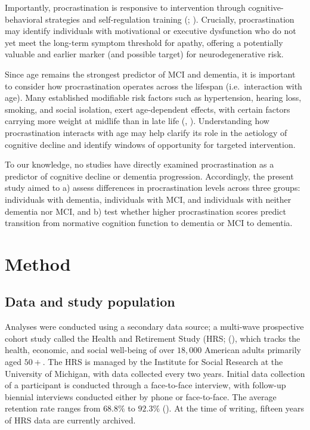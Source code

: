 \documentclass[
]{article}
\begin{document}
Importantly, procrastination is responsive to intervention through
cognitive-behavioral strategies and self-regulation training
(;
). Crucially,
procrastination may identify individuals with motivational or executive
dysfunction who do not yet meet the long-term symptom threshold for
apathy, offering a potentially valuable and earlier marker (and possible
target) for neurodegenerative risk.

Since age remains the strongest predictor of MCI and dementia, it is
important to consider how procrastination operates across the lifespan
(i.e.~interaction with age). Many established modifiable risk factors
such as hypertension, hearing loss, smoking, and social isolation, exert
age-dependent effects, with certain factors carrying more weight at
midlife than in late life (, ). Understanding how
procrastination interacts with age may help clarify its role in the
aetiology of cognitive decline and identify windows of opportunity for
targeted intervention.

To our knowledge, no studies have directly examined procrastination as a
predictor of cognitive decline or dementia progression. Accordingly, the
present study aimed to a) assess differences in procrastination levels
across three groups: individuals with dementia, individuals with MCI,
and individuals with neither dementia nor MCI, and b) test whether
higher procrastination scores predict transition from normative
cognition function to dementia or MCI to dementia.

\section{Method}\label{method}

\subsection{Data and study population}\label{data-and-study-population}

Analyses were conducted using a secondary data source; a multi-wave
prospective cohort study called the Health and Retirement Study (HRS;
(), which tracks the
health, economic, and social well-being of over \(18,000\) American
adults primarily aged \(50+\). The HRS is managed by the Institute for
Social Research at the University of Michigan, with data collected every
two years. Initial data collection of a participant is conducted through
a face-to-face interview, with follow-up biennial interviews conducted
either by phone or face-to-face. The average retention rate ranges from
\(68.8\%\) to \(92.3\%\) (). At the time of writing, fifteen years of HRS data are
currently archived.
\end{document}
